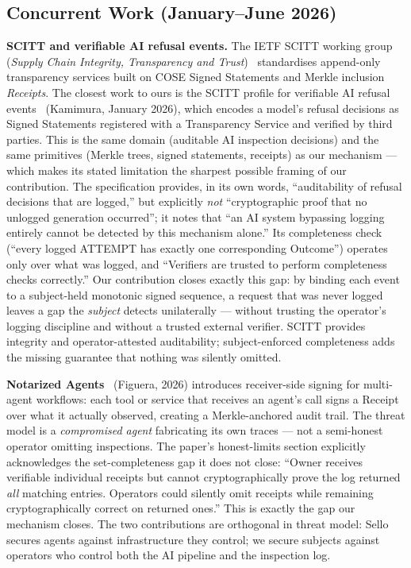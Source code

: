 \documentclass[11pt,a4paper]{article}
\newcommand{\term}[1]{\emph{#1}}
\begin{document}
\subsection*{Concurrent Work (January--June 2026)}

\textbf{SCITT and verifiable AI refusal events.} The IETF SCITT working group
(\textit{Supply Chain Integrity, Transparency and Trust})~\cite{scitt-arch} standardises
append-only transparency services built on COSE Signed Statements and Merkle inclusion
\textit{Receipts}. The closest work to ours is the SCITT profile for verifiable AI
refusal events~\cite{scitt-refusal} (Kamimura, January 2026), which encodes a model's
refusal decisions as Signed Statements registered with a Transparency Service and
verified by third parties. This is the same domain (auditable AI inspection decisions)
and the same primitives (Merkle trees, signed statements, receipts) as our mechanism ---
which makes its stated limitation the sharpest possible framing of our contribution. The
specification provides, in its own words, ``auditability of refusal decisions that are
logged,'' but explicitly \textit{not} ``cryptographic proof that no unlogged generation
occurred''; it notes that ``an AI system bypassing logging entirely cannot be detected
by this mechanism alone.'' Its completeness check (``every logged ATTEMPT has exactly one
corresponding Outcome'') operates only over what was logged, and ``Verifiers are trusted
to perform completeness checks correctly.'' Our contribution closes exactly this gap: by
binding each event to a subject-held monotonic signed sequence, a request that was never
logged leaves a gap the \textit{subject} detects unilaterally --- without trusting the
operator's logging discipline and without a trusted external verifier. SCITT provides
integrity and operator-attested auditability; subject-enforced completeness adds the
missing guarantee that nothing was silently omitted.

\textbf{Notarized Agents}~\cite{sello2026} (Figuera, 2026) introduces receiver-side signing
for multi-agent workflows: each tool or service that receives an agent's call signs a Receipt
over what it actually observed, creating a Merkle-anchored audit trail. The threat model
is a \term{compromised agent} fabricating its own traces --- not a semi-honest operator
omitting inspections. The paper's honest-limits section explicitly acknowledges the
set-completeness gap it does not close: ``Owner receives verifiable individual receipts
but cannot cryptographically prove the log returned \textit{all} matching entries.
Operators could silently omit receipts while remaining cryptographically correct on
returned ones.'' This is exactly the gap our mechanism closes. The two contributions are
orthogonal in threat model: Sello secures agents against infrastructure they control; we
secure subjects against operators who control both the AI pipeline and the inspection log.
\end{document}
